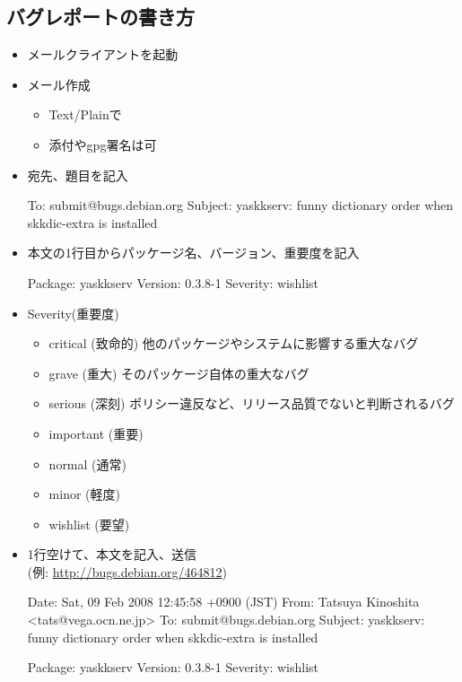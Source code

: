 \documentclass[mingoth,a4paper]{jsarticle}
\begin{document}
\subsection{バグレポートの書き方}
\begin{itemize}
\item メールクライアントを起動

\item メール作成
 \begin{itemize}
 \item Text/Plainで
 \item 添付やgpg署名は可
 \end{itemize}

\item 宛先、題目を記入
\begin{commandline}
To: submit@bugs.debian.org
Subject: yaskkserv: funny dictionary order when skkdic-extra is installed
\end{commandline}

\item 本文の1行目からパッケージ名、バージョン、重要度を記入
\begin{commandline}
Package: yaskkserv
Version: 0.3.8-1
Severity: wishlist
\end{commandline}

\item Severity(重要度)
 \begin{itemize}
 \item critical (致命的)
 他のパッケージやシステムに影響する重大なバグ
 \item grave (重大)
 そのパッケージ自体の重大なバグ
 \item serious (深刻)
 ポリシー違反など、リリース品質でないと判断されるバグ
 \item important (重要)
 \item normal (通常)
 \item minor (軽度)
 \item wishlist (要望)
 \end{itemize}

\item 1行空けて、本文を記入、送信\\
(例: \url{http://bugs.debian.org/464812})
\begin{commandline}
Date: Sat, 09 Feb 2008 12:45:58 +0900 (JST)
From: Tatsuya Kinoshita <tats@vega.ocn.ne.jp>
To: submit@bugs.debian.org
Subject: yaskkserv: funny dictionary order when skkdic-extra is installed

Package: yaskkserv
Version: 0.3.8-1
Severity: wishlist
    

\end{commandline}
\end{itemize}
\end{document}
